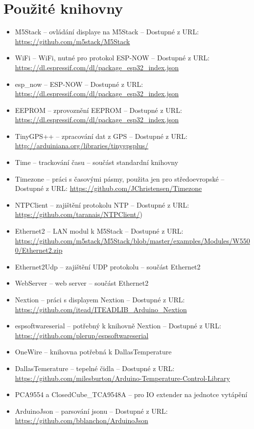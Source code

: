 \documentclass[a4paper,oneside,12pt]{report}
\begin{document}
\section{Použité knihovny}

\begin{itemize}
	\item M5Stack -- ovládání displaye na M5Stack -- Dostupné z URL: \url{https://github.com/m5stack/M5Stack}
	\item WiFi -- WiFi, nutné pro protokol ESP-NOW -- Dostupné z URL: \url{https://dl.espressif.com/dl/package_esp32_index.json}
	\item esp\_now -- ESP-NOW -- Dostupné z URL: \url{https://dl.espressif.com/dl/package_esp32_index.json}
	\item EEPROM -- zprovoznění EEPROM -- Dostupné z URL: \url{https://dl.espressif.com/dl/package_esp32_index.json}
	\item TinyGPS++ -- zpracování dat z GPS -- Dostupné z URL: \url{http://arduiniana.org/libraries/tinygpsplus/}
	\item Time -- trackování času -- součást standardní knihovny
	\item Timezone -- práci s časovými pásmy, použita jen pro středoevropské -- Dostupné z URL: \url{https://github.com/JChristensen/Timezone}
	\item NTPClient -- zajištění protokolu NTP -- Dostupné z URL: \url{https://github.com/taranais/NTPClient/})
	\item Ethernet2 -- LAN modul k M5Stack -- Dostupné z URL: \url{https://github.com/m5stack/M5Stack/blob/master/examples/Modules/W5500/Ethernet2.zip}
	\item Ethernet2Udp -- zajištění UDP protokolu -- součást Ethernet2
	\item WebServer -- web server -- součást Ethernet2
	\item Nextion -- práci s displayem Nextion -- Dostupné z URL: \url{https://github.com/itead/ITEADLIB_Arduino_Nextion}
	\item espsoftwareserial -- potřebný k knihovně Nextion -- Dostupné z URL: \url{https://github.com/plerup/espsoftwareserial}
	\item OneWire -- knihovna potřebná k DallasTemperature
	\item DallasTemerature -- tepelné čidla -- Dostupné z URL: \url{https://github.com/milesburton/Arduino-Temperature-Control-Library}
	\item PCA9554 a ClosedCube\_TCA9548A -- pro IO extender na jednotce vytápění
	\item ArduinoJson -- parsování jsonu -- Dostupné z URL: \url{https://github.com/bblanchon/ArduinoJson}
\end{itemize}
\end{document}
